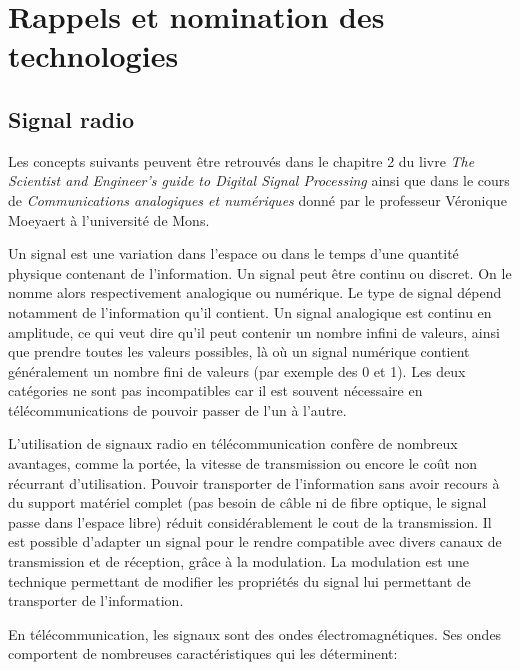 \renewcommand{\leftmark}{NOMINATION DES TECHNOLOGIES}


\chapter{Rappels et nomination des technologies}\label{chap1}

\section{Signal radio}

Les concepts suivants peuvent être retrouvés dans le chapitre 2 du livre \textit{The Scientist and Engineer's guide to Digital Signal Processing} \cite{book2} ainsi que dans le cours de \textit{Communications analogiques et numériques} donné par le professeur Véronique Moeyaert à l'université de Mons.

\vspace{0.1cm}

Un signal est une variation dans l'espace ou dans le temps d'une quantité physique contenant de l'information. Un signal peut être continu ou discret. On le nomme alors respectivement analogique ou numérique. Le type de signal dépend notamment de l'information qu'il contient. Un signal analogique est continu en amplitude, ce qui veut dire qu'il peut contenir un nombre infini de valeurs, ainsi que prendre toutes les valeurs possibles, là où un signal numérique contient généralement un nombre fini de valeurs (par exemple des 0 et 1).
Les deux catégories ne sont pas incompatibles car il est souvent nécessaire en télécommunications de pouvoir passer de l'un à l'autre.

\vspace{0.1cm}

L'utilisation de signaux radio en télécommunication confère de nombreux avantages, comme la portée, la vitesse de transmission  ou encore le coût non récurrant d'utilisation. Pouvoir transporter de l'information sans avoir recours à du support matériel complet (pas besoin de câble ni de fibre optique, le signal passe dans l'espace libre) réduit considérablement le cout de la transmission. Il est possible d'adapter un signal pour le rendre compatible avec divers canaux de transmission et de réception, grâce à la modulation. La modulation est une technique permettant de modifier les propriétés du signal lui permettant de transporter de l'information.

\newpage

En télécommunication, les signaux sont des ondes électromagnétiques. Ses ondes comportent de nombreuses caractéristiques qui les déterminent: 

